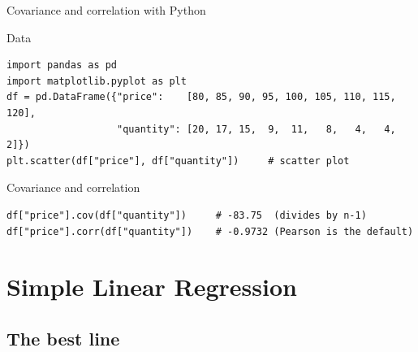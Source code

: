 \documentclass[aspectratio=169,11pt]{beamer}
\begin{document}
\begin{frame}[fragile]{Covariance and correlation with Python}
  \begin{block}{Data}
\begin{lstlisting}
import pandas as pd
import matplotlib.pyplot as plt
df = pd.DataFrame({"price":    [80, 85, 90, 95, 100, 105, 110, 115, 120],
                   "quantity": [20, 17, 15,  9,  11,   8,   4,   4,   2]})
plt.scatter(df["price"], df["quantity"])     # scatter plot
\end{lstlisting}
  \end{block}
  \begin{block}{Covariance and correlation}
\begin{lstlisting}
df["price"].cov(df["quantity"])     # -83.75  (divides by n-1)
df["price"].corr(df["quantity"])    # -0.9732 (Pearson is the default)
\end{lstlisting}
  \end{block}
\end{frame}

\section[Simple regression]{Simple Linear Regression}

\subsection{The best line}
\end{document}
